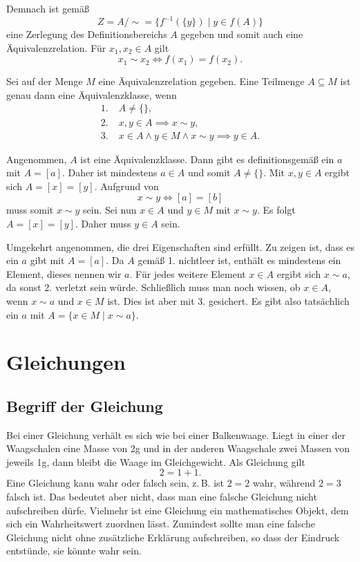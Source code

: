 Demnach ist gemäß
\[Z = A/{\sim} = \{f^{-1}(\{y\})\mid y\in f(A)\}\]
eine Zerlegung des Definitionsbereichs $A$ gegeben und somit auch eine
Äquivalenzrelation. Für $x_1,x_2\in A$ gilt%
\[x_1\sim x_2 \iff f(x_1) = f(x_2).\]

\begin{Satz}
Sei auf der Menge $M$ eine Äquivalenzrelation gegeben. Eine
Teilmenge $A\subseteq M$ ist genau dann eine Äquivalenzklasse,
wenn%
\begin{align*}
1.\;& A\ne\{\},\\
2.\;& x,y\in A\implies x\sim y,\\
3.\;& x\in A\land y\in M\land x\sim y\implies y\in A.
\end{align*}
\end{Satz}
 Angenommen, $A$ ist eine Äquivalenzklasse.
Dann gibt es definitionsgemäß ein $a$ mit $A=[a]$. Daher ist
mindestens $a\in A$ und somit $A\ne\{\}$. Mit $x,y\in A$ ergibt
sich $A=[x]=[y]$. Aufgrund von%
\[x\sim y \iff [a]=[b]\]
muss somit $x\sim y$ sein. Sei nun $x\in A$ und $y\in M$ mit
$x\sim y$. Es folgt $A=[x]=[y]$. Daher muss $y\in A$ sein.

Umgekehrt angenommen, die drei Eigenschaften sind erfüllt.
Zu zeigen ist, dass es ein $a$ gibt mit $A=[a]$. Da $A$ gemäß 1.
nichtleer ist, enthält es mindestens ein Element, dieses nennen wir
$a$. Für jedes weitere Element $x\in A$ ergibt sich
$x\sim a$, da sonst 2. verletzt sein würde. Schließlich muss man
noch wissen, ob $x\in A$, wenn $x\sim a$ und $x\in M$ ist.
Dies ist aber mit 3. gesichert. Es gibt also
tatsächlich ein $a$ mit $A=\{x\in M\mid x\sim a\}$.\;\qedsymbol

\newpage
\section{Gleichungen}
\subsection{Begriff der Gleichung}

Bei einer Gleichung verhält es sich wie bei einer Balkenwaage. Liegt
in einer der Waagschalen eine Masse von 2g und in der anderen
Waagschale zwei Massen von jeweils 1g, dann bleibt die Waage im
Gleichgewicht. Als Gleichung gilt
\[2=1+1.\]
Eine Gleichung kann wahr oder falsch sein, z.\,B. ist $2=2$
wahr, während $2=3$ falsch ist. Das bedeutet aber nicht, dass man
eine falsche Gleichung nicht aufschreiben dürfe. Vielmehr ist eine
Gleichung ein mathematisches Objekt, dem sich ein Wahrheitswert
zuordnen lässt. Zumindest sollte man eine falsche Gleichung nicht
ohne zusätzliche Erklärung aufschreiben, so dass der Eindruck
entstünde, sie könnte wahr sein.

